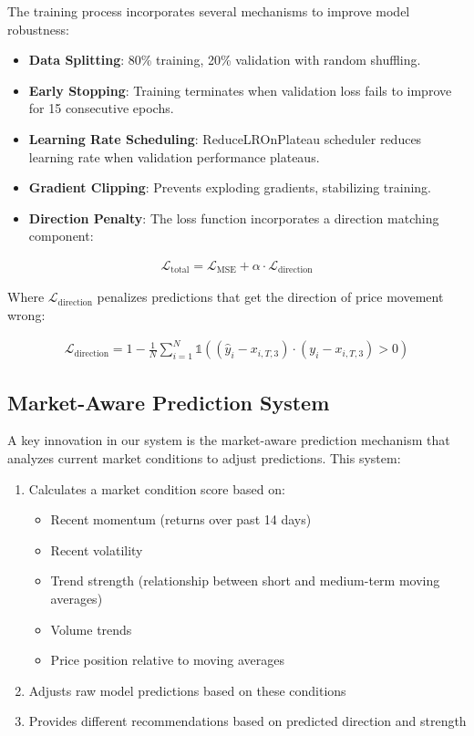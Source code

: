 \documentclass[conference]{IEEEtran}
\begin{document}
The training process incorporates several mechanisms to improve model robustness:

\begin{itemize}
\item \textbf{Data Splitting}: 80\% training, 20\% validation with random shuffling.
\item \textbf{Early Stopping}: Training terminates when validation loss fails to improve for 15 consecutive epochs.
\item \textbf{Learning Rate Scheduling}: ReduceLROnPlateau scheduler reduces learning rate when validation performance plateaus.
\item \textbf{Gradient Clipping}: Prevents exploding gradients, stabilizing training.
\item \textbf{Direction Penalty}: The loss function incorporates a direction matching component:
\end{itemize}

\begin{equation}
\begin{aligned}
\mathcal{L}_{\text{total}} = \mathcal{L}_{\text{MSE}} + \alpha \cdot \mathcal{L}_{\text{direction}}
\end{aligned}
\end{equation}

Where $\mathcal{L}_{\text{direction}}$ penalizes predictions that get the direction of price movement wrong:

\begin{equation}
\begin{aligned}
\mathcal{L}_{\text{direction}} = 1 - \frac{1}{N}\sum_{i=1}^{N} \mathbb{1}((\hat{y}_i - x_{i,T,3}) \cdot (y_i - x_{i,T,3}) > 0)
\end{aligned}
\end{equation}

\subsection{Market-Aware Prediction System}

A key innovation in our system is the market-aware prediction mechanism that analyzes current market conditions to adjust predictions. This system:

\begin{enumerate}
\item Calculates a market condition score based on:
   \begin{itemize}
   \item Recent momentum (returns over past 14 days)
   \item Recent volatility
   \item Trend strength (relationship between short and medium-term moving averages)
   \item Volume trends
   \item Price position relative to moving averages
   \end{itemize}
\item Adjusts raw model predictions based on these conditions
\item Provides different recommendations based on predicted direction and strength
\end{enumerate}
\end{document}
